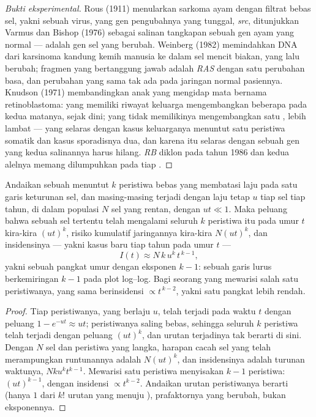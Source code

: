 \begin{proof}[Bukti eksperimental]
Rous (1911) menularkan sarkoma ayam dengan filtrat bebas sel, yakni
sebuah virus, yang gen pengubahnya yang tunggal, \emph{src}, ditunjukkan
Varmus dan Bishop (1976) sebagai salinan tangkapan sebuah gen ayam yang normal
---  adalah gen sel yang berubah. Weinberg (1982) memindahkan
DNA dari karsinoma kandung kemih manusia ke dalam sel mencit biakan, yang lalu
berubah; fragmen yang bertanggung jawab adalah \emph{RAS} dengan
satu perubahan basa, dan perubahan yang sama tak ada pada jaringan normal
pasiennya. Knudson (1971) membandingkan anak yang mengidap  mata
bernama retinoblastoma: yang memiliki riwayat keluarga mengembangkan beberapa
 pada kedua matanya, sejak dini; yang tidak memilikinya mengembangkan
satu , lebih lambat --- yang selaras dengan kasus keluarganya menuntut
satu peristiwa somatik dan kasus sporadisnya dua, dan karena itu selaras
dengan sebuah gen yang kedua salinannya harus hilang. \emph{RB} diklon
pada tahun 1986 dan kedua alelnya memang dilumpuhkan pada tiap .
\end{proof}

\begin{theorem}\label{thm:b3:cancer-biology:armitage-doll}
Andaikan sebuah  menuntut $k$ peristiwa bebas yang membatasi laju pada
satu garis keturunan sel, dan masing-masing terjadi dengan laju tetap $u$ tiap
sel tiap tahun, di dalam populasi $N$ sel yang rentan, dengan $ut \ll 1$. Maka
peluang bahwa sebuah sel tertentu telah mengalami seluruh $k$ peristiwa itu
pada umur $t$ kira-kira $(ut)^{k}$, risiko kumulatif jaringannya kira-kira
$N(ut)^{k}$, dan insidensinya --- yakni kasus baru tiap tahun pada umur $t$ ---
\[
I(t) \approx N\,k\,u^{k}\,t^{\,k-1},
\]
yakni sebuah pangkat umur dengan eksponen $k - 1$: sebuah garis lurus
berkemiringan $k - 1$ pada plot log--log. Bagi seorang yang mewarisi salah satu
peristiwanya,  yang sama berinsidensi $\propto t^{\,k-2}$, yakni satu
pangkat lebih rendah.
\end{theorem}
\begin{proof}
Tiap peristiwanya, yang berlaju $u$, telah terjadi pada waktu $t$ dengan
peluang $1 - e^{-ut} \approx ut$; peristiwanya saling bebas, sehingga seluruh
$k$ peristiwa telah terjadi dengan peluang $(ut)^{k}$, dan urutan terjadinya
tak berarti di sini. Dengan $N$ sel dan peristiwa yang langka, harapan cacah
sel yang telah merampungkan runtunannya adalah
$N(ut)^{k}$, dan insidensinya adalah turunan waktunya, $Nku^{k}t^{k-1}$.
Mewarisi satu peristiwa menyisakan $k - 1$ peristiwa: $(ut)^{k-1}$, dengan
insidensi $\propto t^{k-2}$. Andaikan urutan peristiwanya berarti (hanya $1$
dari $k!$ urutan yang menuju ), prafaktornya yang berubah, bukan eksponennya.
\end{proof}

